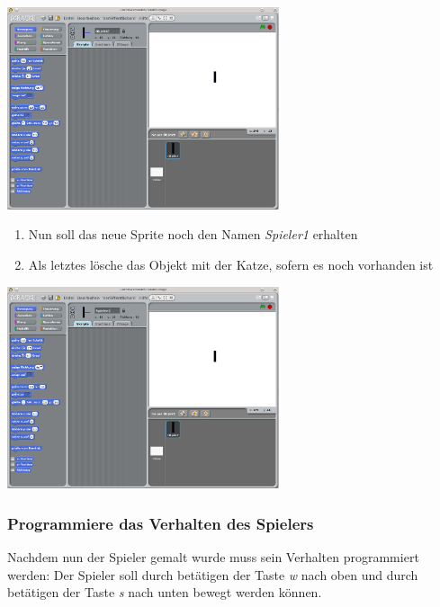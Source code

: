 \includegraphics[width=0.6\textwidth]{images/aufgabe5_pong_sprite_spieler1_1.png}
\begin{enumerate}\addtocounter{enumi}{6}
\item Nun soll das neue Sprite noch den Namen \emph{Spieler1} erhalten
\item Als letztes lösche das Objekt mit der Katze, sofern es noch vorhanden ist
\end{enumerate}
\includegraphics[width=0.6\textwidth]{images/aufgabe5_pong_sprite_spieler1_2.png}

\subsubsection{Programmiere das Verhalten des Spielers}

Nachdem nun der Spieler gemalt wurde muss sein Verhalten programmiert werden: Der Spieler soll durch betätigen der Taste \emph{w} nach oben und durch betätigen der Taste \emph{s} nach unten bewegt werden können.


